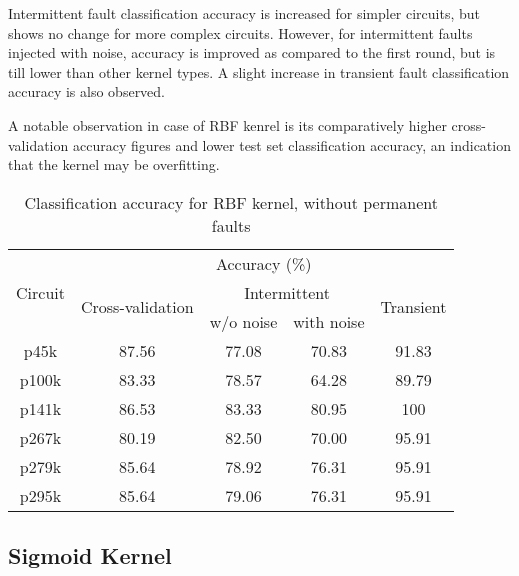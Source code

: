 Intermittent fault classification accuracy is increased for simpler circuits, but shows no change for more complex circuits. However, for intermittent faults injected with noise, accuracy is improved as compared to the first round, but is till lower than other kernel types. A slight increase in transient fault classification accuracy is also observed. 

A notable observation in case of RBF kenrel is its comparatively higher cross-validation accuracy figures and lower test set classification accuracy, an indication that the kernel may be overfitting.

\begin{table}[h]
	\captionsetup{justification=centering}
\begin{tabular}{ccccc}
\hline
\multirow{3}{*}{Circuit} & \multicolumn{4}{c}{Accuracy (\%)}                                                                 \\ \cline{2-5} 
                         & \multirow{2}{*}{Cross-validation} & \multicolumn{2}{c}{Intermittent} & \multirow{2}{*}{Transient} \\ \cline{3-4}
                         &                                   & w/o noise      & with noise      &                            \\ \hline
p45k                     & 87.56                             & 77.08          & 70.83           & 91.83                      \\
p100k                    & 83.33                             & 78.57          & 64.28           & 89.79                      \\
p141k                    & 86.53                             & 83.33          & 80.95           & 100                        \\
p267k                    & 80.19                             & 82.50          & 70.00           & 95.91                      \\
p279k                    & 85.64                             & 78.92          & 76.31           & 95.91                      \\
p295k                    & 85.64                             & 79.06          & 76.31           & 95.91  						  \\
\hline
\end{tabular}
\caption {Classification accuracy for RBF kernel, without permanent faults}
\label{tab:rbfwop}
\end{table}


\subsection{Sigmoid Kernel}


